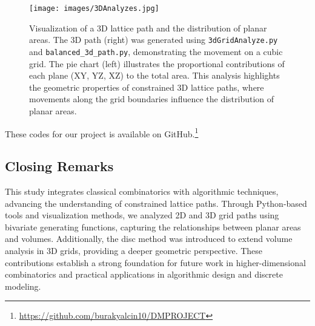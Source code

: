 \documentclass{article}
\begin{document}
\begin{figure}[H]
\centering
\texttt{[image: images/3DAnalyzes.jpg]}
\caption{Visualization of a 3D lattice path and the distribution of planar areas. 
The 3D path (right) was generated using \texttt{3dGridAnalyze.py} and \texttt{balanced\_3d\_path.py}, demonstrating the movement on a cubic grid. 
The pie chart (left) illustrates the proportional contributions of each plane (XY, YZ, XZ) to the total area. 
This analysis highlights the geometric properties of constrained 3D lattice paths, where movements along the grid boundaries influence the distribution of planar areas.}
\label{fig:3d_grid_analysis}
\end{figure}

These codes for our project is available on GitHub.\footnote{\url{https://github.com/burakyalcin10/DMPROJECT}}



\subsection{Closing Remarks}
\indent This study integrates classical combinatorics with algorithmic techniques, advancing the understanding of constrained lattice paths. Through Python-based tools and visualization methods, we analyzed 2D and 3D grid paths using bivariate generating functions, capturing the relationships between planar areas and volumes. Additionally, the disc method was introduced to extend volume analysis in 3D grids, providing a deeper geometric perspective. These contributions establish a strong foundation for future work in higher-dimensional combinatorics and practical applications in algorithmic design and discrete modeling.
\end{document}
